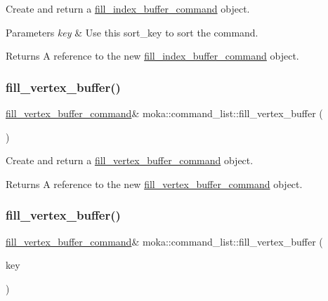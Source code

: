 Create and return a \mbox{\hyperlink{classmoka_1_1fill__index__buffer__command}{fill\+\_\+index\+\_\+buffer\+\_\+command}} object. 


\begin{DoxyParams}{Parameters}
{\em key} & Use this sort\+\_\+key to sort the command. \\
\hline
\end{DoxyParams}
\begin{DoxyReturn}{Returns}
A reference to the new \mbox{\hyperlink{classmoka_1_1fill__index__buffer__command}{fill\+\_\+index\+\_\+buffer\+\_\+command}} object. 
\end{DoxyReturn}
\mbox{\label{classmoka_1_1command__list_a97e4a16edf37b62eff5de88fae1d146e}} 
\subsubsection{\texorpdfstring{fill\_vertex\_buffer()}{fill\_vertex\_buffer()}\hspace{0.1cm}{\footnotesize\ttfamily [1/2]}}
{\footnotesize\ttfamily \mbox{\hyperlink{classmoka_1_1fill__vertex__buffer__command}{fill\+\_\+vertex\+\_\+buffer\+\_\+command}}\& moka\+::command\+\_\+list\+::fill\+\_\+vertex\+\_\+buffer (\begin{DoxyParamCaption}{ }\end{DoxyParamCaption})}



Create and return a \mbox{\hyperlink{classmoka_1_1fill__vertex__buffer__command}{fill\+\_\+vertex\+\_\+buffer\+\_\+command}} object. 

\begin{DoxyReturn}{Returns}
A reference to the new \mbox{\hyperlink{classmoka_1_1fill__vertex__buffer__command}{fill\+\_\+vertex\+\_\+buffer\+\_\+command}} object. 
\end{DoxyReturn}
\mbox{\label{classmoka_1_1command__list_a7f312a45afd5eca984eee0210f4e4e51}} 
\subsubsection{\texorpdfstring{fill\_vertex\_buffer()}{fill\_vertex\_buffer()}\hspace{0.1cm}{\footnotesize\ttfamily [2/2]}}
{\footnotesize\ttfamily \mbox{\hyperlink{classmoka_1_1fill__vertex__buffer__command}{fill\+\_\+vertex\+\_\+buffer\+\_\+command}}\& moka\+::command\+\_\+list\+::fill\+\_\+vertex\+\_\+buffer (\begin{DoxyParamCaption}\item[{\mbox{\hyperlink{namespacemoka_afa30a616e67b83113ebdb857555cf2bb}{sort\+\_\+key}}}]{key }\end{DoxyParamCaption})}



